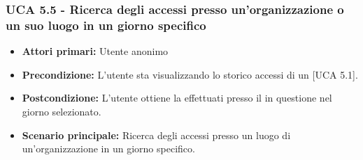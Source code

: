 \subsubsection{UCA 5.5 - Ricerca degli accessi presso un'organizzazione o un suo luogo in un giorno specifico}
\begin{itemize}
    \item \textbf{Attori primari:} Utente anonimo
    \item \textbf{Precondizione:} L'utente sta visualizzando lo storico accessi di un  [UCA 5.1].
    \item \textbf{Postcondizione:} L'utente ottiene la  effettuati presso il  in questione nel giorno selezionato.
    \item \textbf{Scenario principale:} Ricerca degli accessi presso un luogo di un'organizzazione in un giorno specifico.
\end{itemize}
